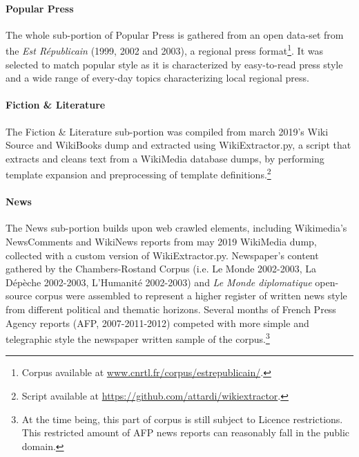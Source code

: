 \paragraph{\Cabernet Popular Press} \label{subsec:DescribeCaBeRnetPop}
The whole sub-portion of Popular Press is gathered from an open data-set from the \textit{Est  Républicain} (1999, 2002 and 2003), a regional press format\footnote{Corpus available at \url{www.cnrtl.fr/corpus/estrepublicain/}.}. %
It was selected to match popular style as it is characterized by easy-to-read press style and a wide range of every-day topics characterizing local regional press.

\paragraph{\Cabernet Fiction \& Literature} \label{subsec:DescribeCaBeRnetFic}
The Fiction \& Literature sub-portion was compiled from march 2019's Wiki Source and WikiBooks dump and extracted using WikiExtractor.py, a script that extracts and cleans text from a WikiMedia database dumps, by performing template expansion and preprocessing of template definitions.\footnote{Script available at \url{https://github.com/attardi/wikiextractor}.}

\paragraph{\Cabernet News} \label{subsec:DescribeCaBeRnetNews}
The News sub-portion builds upon web crawled elements, including Wikimedia's NewsComments and WikiNews reports from may 2019 WikiMedia dump, collected with a custom version of WikiExtractor.py.
Newspaper's content gathered by the Chambers-Rostand Corpus (i.e. Le Monde 2002-2003, La Dépèche 2002-2003, L'Humanité 2002-2003) and \textit{Le Monde diplomatique} open-source corpus were assembled to represent a higher register of written news style from different political and thematic horizons.
Several months of French Press Agency reports (AFP, 2007-2011-2012) competed with more simple and telegraphic style the newspaper written sample of the corpus.\footnote{At the time being, this part of \Cabernet corpus is still subject to Licence restrictions. This restricted amount of AFP news reports can reasonably fall in the public domain.}


